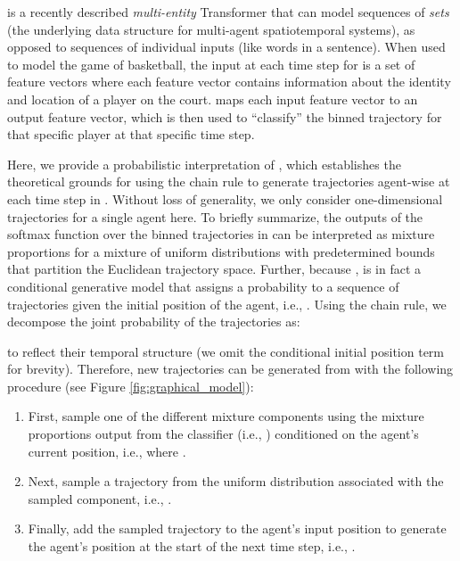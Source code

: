 \btv{} is a recently described \textit{multi-entity} Transformer that can model sequences of \textit{sets} (the underlying data structure for multi-agent spatiotemporal systems), as opposed to sequences of individual inputs (like words in a sentence).
When used to model the game of basketball, the input at each time step for \btv{} is a set of feature vectors where each feature vector contains information about the identity and location of a player on the court.
\btv{} maps each input feature vector to an output feature vector, which is then used to ``classify'' the binned trajectory for that specific player at that specific time step.

Here, we provide a probabilistic interpretation of \btv{}, which establishes the theoretical grounds for using the chain rule to generate trajectories agent-wise at each time step in \btvpp{}.
Without loss of generality, we only consider one-dimensional trajectories for a single agent here.
To briefly summarize, the outputs of the softmax function over the  binned trajectories in \btv{} can be interpreted as mixture proportions for a mixture of uniform distributions with predetermined bounds that partition the Euclidean trajectory space.
Further, because , \btv{} is in fact a conditional generative model that assigns a probability to a sequence of trajectories given the initial position of the agent, i.e., .
Using the chain rule, we decompose the joint probability of the trajectories as:



\noindent
to reflect their temporal structure (we omit the conditional initial position term for brevity).
Therefore, new trajectories can be generated from \btv{} with the following procedure (see Figure \ref{fig:graphical_model}):

\begin{enumerate}
    \item First, sample one of the  different mixture components using the mixture proportions output from the classifier  (i.e., \btv{}) conditioned on the agent's current position, i.e.,  where .
    \item Next, sample a trajectory from the uniform distribution associated with the sampled component, i.e., .
    \item Finally, add the sampled trajectory to the agent's input position to generate the agent's position at the start of the next time step, i.e., .
\end{enumerate}


